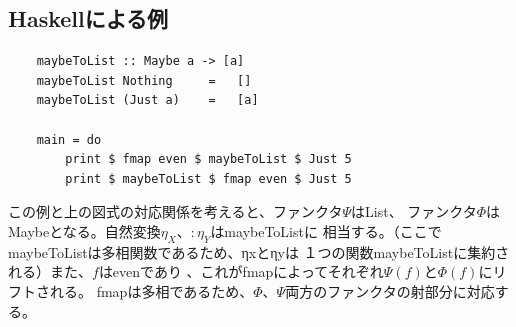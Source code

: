 \documentclass{jsarticle}
\begin{document}
\subsection{Haskellによる例}
\begin{lstlisting}
    maybeToList :: Maybe a -> [a]
    maybeToList Nothing     =   []
    maybeToList (Just a)    =   [a]

    main = do
        print $ fmap even $ maybeToList $ Just 5
        print $ maybeToList $ fmap even $ Just 5
\end{lstlisting}
この例と上の図式の対応関係を考えると、ファンクタ$\Psi$はList、
ファンクタ$\Phi$はMaybeとなる。自然変換$\eta_X$、$:\eta_Y$はmaybeToListに
相当する。（ここでmaybeToListは多相関数であるため、ηxとηyは
１つの関数maybeToListに集約される）また、$f$はevenであり
、これがfmapによってそれぞれ$\Psi(f)$と$\Phi(f)$にリフトされる。
fmapは多相であるため、$\Phi$、$\Psi$両方のファンクタの射部分に対応する。
\end{document}
